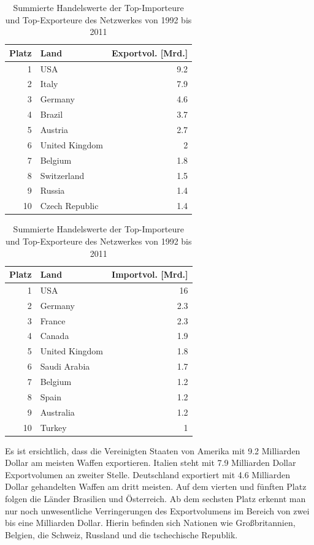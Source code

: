 \documentclass[a4paper,ngerman,oneside,titlepage,bibliography=totoc,11pt]{scrreprt}
\begin{document}
\begin{table}[ht]

\centering

\begin{minipage}[t]{0.48\textwidth}
\footnotesize
\begin{tabular}{rlr}
  \hline
 Platz & Land & Exportvol. [Mrd.]\\ 
  \hline
1 & USA & 9.2\\ 
  2 & Italy & 7.9 \\ 
  3 & Germany & 4.6 \\ 
  4 & Brazil & 3.7 \\ 
  5 & Austria & 2.7 \\ 
  6 & United Kingdom & 2 \\ 
  7 & Belgium & 1.8 \\ 
  8 & Switzerland & 1.5 \\ 
  9 & Russia & 1.4 \\ 
  10 & Czech Republic & 1.4 \\ 
   \hline
	\end{tabular}
	\end{minipage}	
\hfill	
\begin{minipage}[t]{0.48\textwidth}	
\footnotesize
\begin{tabular}{rlr}
  \hline
 Platz & Land & Importvol. [Mrd.]\\ 
  \hline
1 & USA & 16\\ 
  2 & Germany & 2.3\\ 
  3 & France & 2.3\\ 
  4 & Canada & 1.9 \\ 
  5 & United Kingdom & 1.8\\  
  6 & Saudi Arabia & 1.7\\ 
  7 & Belgium & 1.2\\ 
  8 & Spain & 1.2\\ 
  9 & Australia & 1.2\\ 
  10 & Turkey & 1\\ 
   \hline
\end{tabular}
\end{minipage}
\caption{Summierte Handelswerte der Top-Importeure und Top-Exporteure des Netzwerkes von 1992 bis 2011}
\label{tab:tops1}
\end{table}


Es ist ersichtlich, dass die Vereinigten Staaten von Amerika mit 9.2 Milliarden Dollar am meisten Waffen exportieren. Italien steht mit 7.9 Milliarden Dollar Exportvolumen an zweiter Stelle. Deutschland exportiert mit 4.6 Milliarden Dollar gehandelten Waffen am dritt meisten. Auf dem vierten und fünften Platz folgen die Länder Brasilien und Österreich. Ab dem sechsten Platz erkennt man nur noch unwesentliche Verringerungen des Exportvolumens im Bereich von zwei bis eine Milliarden Dollar. Hierin befinden sich Nationen wie Großbritannien, Belgien, die Schweiz, Russland und die tschechische Republik. 
\end{document}
